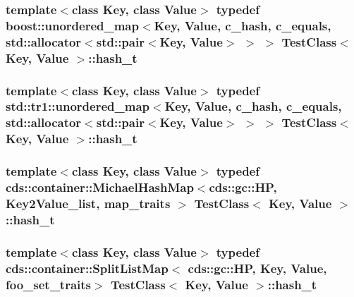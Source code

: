 \subsubsection[{hash\+\_\+t}]{\setlength{\rightskip}{0pt plus 5cm}template$<$class Key, class Value$>$ typedef boost\+::unordered\+\_\+map$<$Key, {\bf Value}, {\bf c\+\_\+hash}, {\bf c\+\_\+equals}, std\+::allocator$<$std\+::pair$<$Key, {\bf Value}$>$ $>$ $>$ {\bf Test\+Class}$<$ Key, {\bf Value} $>$\+::{\bf hash\+\_\+t}\hspace{0.3cm}{\ttfamily [private]}}\label{class_test_class_a8169ffe4884a5ad6488eb7893452ebb1}
\hypertarget{class_test_class_a8fb58a1993096d04900e63c7901dbe75}{}
\subsubsection[{hash\+\_\+t}]{\setlength{\rightskip}{0pt plus 5cm}template$<$class Key, class Value$>$ typedef std\+::tr1\+::unordered\+\_\+map$<$Key, {\bf Value}, {\bf c\+\_\+hash}, {\bf c\+\_\+equals}, std\+::allocator$<$std\+::pair$<$Key, {\bf Value}$>$ $>$ $>$ {\bf Test\+Class}$<$ Key, {\bf Value} $>$\+::{\bf hash\+\_\+t}\hspace{0.3cm}{\ttfamily [private]}}\label{class_test_class_a8fb58a1993096d04900e63c7901dbe75}
\hypertarget{class_test_class_acff06dce1120b0a2879c55f7a5e5acc7}{}
\subsubsection[{hash\+\_\+t}]{\setlength{\rightskip}{0pt plus 5cm}template$<$class Key, class Value$>$ typedef cds\+::container\+::\+Michael\+Hash\+Map$<$cds\+::gc\+::\+H\+P, {\bf Key2\+Value\+\_\+list}, {\bf map\+\_\+traits} $>$ {\bf Test\+Class}$<$ Key, {\bf Value} $>$\+::{\bf hash\+\_\+t}\hspace{0.3cm}{\ttfamily [private]}}\label{class_test_class_acff06dce1120b0a2879c55f7a5e5acc7}
\hypertarget{class_test_class_a8220399a41bb1a4b93273090306ea770}{}
\subsubsection[{hash\+\_\+t}]{\setlength{\rightskip}{0pt plus 5cm}template$<$class Key, class Value$>$ typedef cds\+::container\+::\+Split\+List\+Map$<$ cds\+::gc\+::\+H\+P, Key, {\bf Value}, {\bf foo\+\_\+set\+\_\+traits}$>$ {\bf Test\+Class}$<$ Key, {\bf Value} $>$\+::{\bf hash\+\_\+t}\hspace{0.3cm}{\ttfamily [private]}}\label{class_test_class_a8220399a41bb1a4b93273090306ea770}
\hypertarget{class_test_class_a5c18ae754153ec12a6591663ca817565}{}
